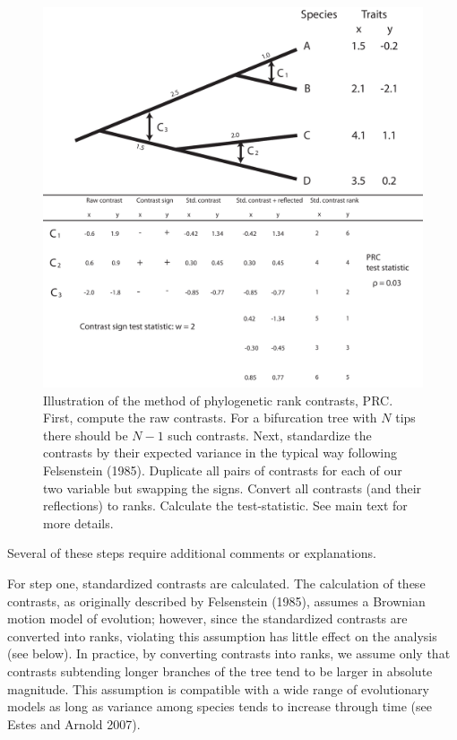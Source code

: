 \documentclass[fleqn,10pt,lineno]{wlpeerj} %
\begin{document}
\begin{figure}
\includegraphics[width=1\linewidth]{schematic} \caption{Illustration of the method of phylogenetic rank contrasts, PRC. First, compute the raw contrasts. For a bifurcation tree with $N$ tips there should be $N-1$ such contrasts. Next, standardize the contrasts by their expected variance in the typical way following Felsenstein (1985). Duplicate all pairs of contrasts for each of our two variable but swapping the signs. Convert all contrasts (and their reflections) to ranks. Calculate the test-statistic. See main text for more details.}\label{fig:Harmon-fig1}
\end{figure}

Several of these steps require additional comments or explanations.

For step one, standardized contrasts are calculated. The calculation of these contrasts, as originally described by Felsenstein (1985), assumes a Brownian motion model of evolution; however, since the standardized contrasts are converted into ranks, violating this assumption has little effect on the analysis (see below). In practice, by converting contrasts into ranks, we assume only that contrasts subtending longer branches of the tree tend to be larger in absolute magnitude. This assumption is compatible with a wide range of evolutionary models as long as variance among species tends to increase through time (see Estes and Arnold 2007).
\end{document}
